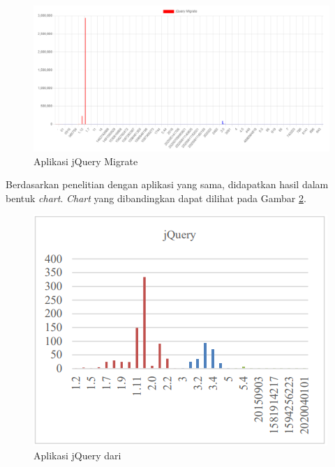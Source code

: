 \begin{figure}[H]
	\centering  
	\includegraphics[scale=0.7]{Gambar/data_sample_jQuery_migrate.png}  
	\caption{Aplikasi jQuery Migrate} 
	\label{fig:data_sample_jQuery_migrate} 
\end{figure}

Berdasarkan penelitian dengan aplikasi yang sama, didapatkan hasil dalam bentuk \textit{chart}. \textit{Chart} yang dibandingkan dapat dilihat pada Gambar \ref{fig:data_sample_jQuery_p}.

\begin{figure}[H]
	\centering  
	\includegraphics[scale=0.7]{Gambar/chart_pascal_jQuery.PNG}  
	\caption{Aplikasi jQuery dari \cite{pascal}} 
	\label{fig:data_sample_jQuery_p} 
\end{figure}